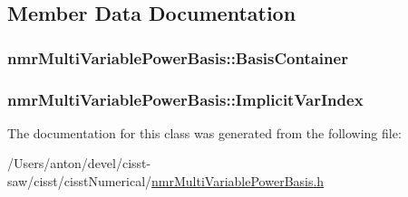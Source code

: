 \subsection{Member Data Documentation}
\hypertarget{classnmr_multi_variable_power_basis_ab3a42fd570e56f493446698ddf5dcb76}{}
\subsubsection[{Basis\+Container}]{ nmr\+Multi\+Variable\+Power\+Basis\+::\+Basis\+Container\hspace{0.3cm}{\ttfamily [protected]}}\label{classnmr_multi_variable_power_basis_ab3a42fd570e56f493446698ddf5dcb76}
\hypertarget{classnmr_multi_variable_power_basis_a57dbcaaf1e35dabe83b0aa0a01e8b8e4}{}
\subsubsection[{Implicit\+Var\+Index}]{ nmr\+Multi\+Variable\+Power\+Basis\+::\+Implicit\+Var\+Index\hspace{0.3cm}{\ttfamily [protected]}}\label{classnmr_multi_variable_power_basis_a57dbcaaf1e35dabe83b0aa0a01e8b8e4}


The documentation for this class was generated from the following file\+:\begin{DoxyCompactItemize}
\item 
/\+Users/anton/devel/cisst-\/saw/cisst/cisst\+Numerical/\hyperlink{nmr_multi_variable_power_basis_8h}{nmr\+Multi\+Variable\+Power\+Basis.\+h}\end{DoxyCompactItemize}
